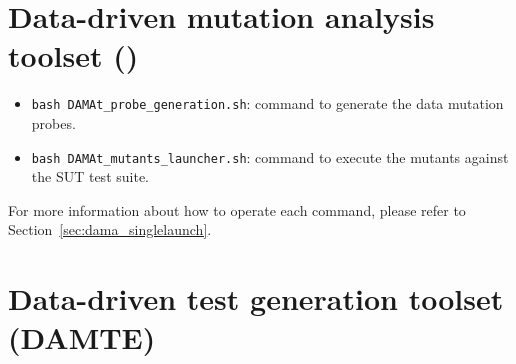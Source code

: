 {\section{Data-driven mutation analysis toolset (\DAMA)}
\begin{itemize}
\item \texttt{bash DAMAt\_probe\_generation.sh}: command to generate the data mutation probes.
\item \texttt{bash DAMAt\_mutants\_launcher.sh}: command to execute the mutants against the SUT test suite.
\end{itemize}

For more information about how to operate each command, please refer to Section~\ref{sec:dama_singlelaunch}.

\section{Data-driven test generation toolset (DAMTE)}
}
